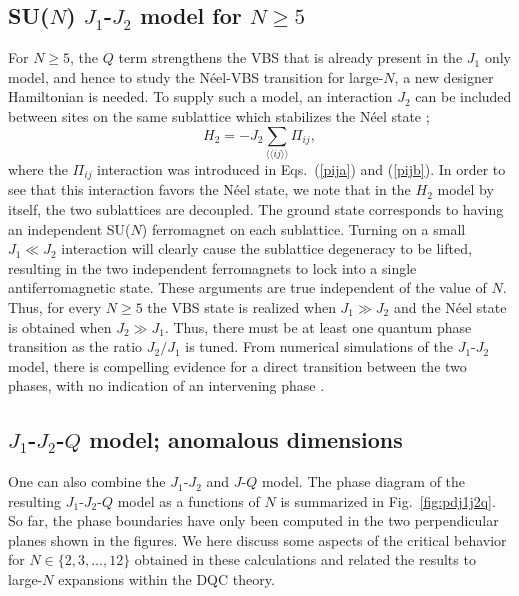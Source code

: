 \documentclass[10pt,pre,aps,twocolumn,showpacs,superscriptaddress,floatfix]{revtex4-1}
\begin{document}
\subsection{SU($N$) $J_1$-$J_2$ model for $N\geq 5$}
\label{ss:j1j2N}

For $N\geq 5$, the $Q$ term strengthens the VBS that is already present in the $J_1$ only model, and hence to study the N\'eel-VBS transition 
for large-$N$, a new designer Hamiltonian is needed. To supply such a model, an interaction $J_2$ can be included between sites on the same sublattice 
which stabilizes the N\'eel state \cite{kaul2011:j1j2};
\begin{equation}
H_{2}= -J_2 \sum_{\langle\langle ij\rangle\rangle} \Pi_{ij},
\end{equation}
where the $\Pi_{ij}$ interaction was introduced in Eqs.~(\ref{pija}) and (\ref{pijb}).
In order to see that this interaction favors the N\'eel state, we note that in the $H_{2}$ model by itself, the two sublattices 
are decoupled. The ground state corresponds to having an independent SU($N$) ferromagnet on each sublattice. Turning on a small $J_1\ll J_2$ 
interaction will clearly cause the sublattice degeneracy to be lifted, resulting in the two independent ferromagnets to lock into a single
antiferromagnetic state. These arguments are true independent of the value of $N$. Thus, for every $N\geq 5$ the VBS state is realized when 
$J_1\gg J_2$ and the N\'eel state is obtained when $J_2 \gg J_1$. Thus, there must be at least one quantum phase transition as the ratio
$J_2/J_1$ is tuned. From numerical simulations of the $J_1$-$J_2$ model, there is compelling evidence for a direct transition between the two 
phases, with no indication of an intervening phase \cite{kaul2011:j1j2}. 

\subsection{$J_1$-$J_2$-$Q$ model; anomalous dimensions}
\label{ss:j1j2q}

One can also combine the $J_1$-$J_2$ and $J$-$Q$ model. The phase diagram of the resulting $J_1$-$J_2$-$Q$ model as a functions of $N$ is
summarized in Fig.~\ref{fig:pdj1j2q}. So far, the phase boundaries have only been computed in the two perpendicular planes shown in the figures.
We here discuss some aspects of the critical behavior for $N \in \{2,3,\ldots,12\}$ obtained in these calculations and related the results to
large-$N$ expansions within the DQC theory.
\end{document}
